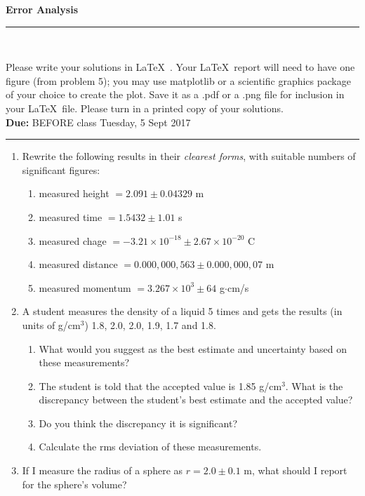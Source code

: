 \documentclass[aps,twocolumn,secnumarabic,balancelastpage,amsmath,amssymb,nofootinbib]{revtex4-1}
\begin{document}
\thispagestyle{empty}
\begin{center}
{\large \bf Error Analysis}
\rule{\columnwidth}{0.5pt}\\[-10mm]
\end{center}
Please write your solutions in \LaTeX\ . Your \LaTeX\ report will need to have one figure 
(from problem 5); you may use matplotlib or a scientific graphics package of your choice
to create the plot. Save it as a .pdf or a .png file for inclusion in your \LaTeX\ file. Please turn in
a printed copy of your solutions. \\
\textbf{Due:} BEFORE class Tuesday, 5 Sept 2017\\
\rule{\columnwidth}{0.5pt}


\begin{enumerate}
\item Rewrite the following results in their \textit{clearest forms}, with suitable numbers of significant figures:
	\begin{enumerate}
	\item measured height $ = 2.091 \pm 0.04329$ m
	\item  measured time $ = 1.5432 \pm 1.01$ s
	\item measured chage $ = -3.21\times 10^{-18} \pm 2.67 \times 10^{-20}$ C
	\item measured distance $ = 0.000,000,563 \pm 0.000,000,07$ m
	\item measured momentum $ = 3.267\times 10^3 \pm 64$ g$\cdot$cm/s
	\end{enumerate}


\item A student measures the density of a liquid 5 times and gets the results (in units of g/cm$^3$)  1.8,  2.0, 2.0, 1.9, 1.7 and 1.8. 
	\begin{enumerate}
	\item What would you suggest as the best estimate and uncertainty based on these measurements?
	\item The student is told that the accepted value is 1.85 g/cm$^3$. What is the discrepancy between the student's best estimate and the accepted value?
	\item Do you think the discrepancy it is significant?
	\item Calculate the rms deviation of these measurements.
	\end{enumerate}

\item If I measure the radius of a sphere as $r = 2.0 \pm 0.1$ m, what should I report for the sphere's volume?


\end{enumerate}
\end{document}
